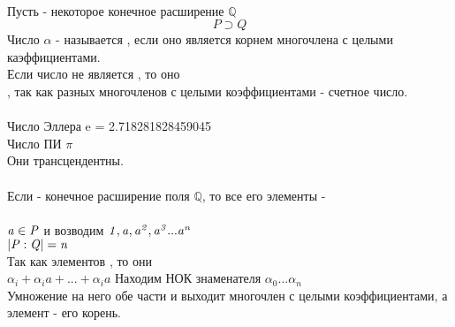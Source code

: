  \\
Пусть  - некоторое конечное расширение $\mathbb Q$\\
\[P \supset Q \]
Число $\alpha$ - называется , если оно является корнем многочлена с целыми каэффициентами. \\
Если число не является , то оно  \\

, так как разных многочленов с целыми коэффициентами - счетное число. \\
 \\
Число Эллера {\bk e} = 2.718281828459045 \\
Число ПИ $\pi $ \\
Они трансцендентны.\\

 \\

Если  - конечное расширение поля $\mathbb {Q}$, то все его элементы -  \\

 \\
$\mathit {a \in P}$ и возводим $\mathit {1, a, a^2, a^3...a^n}$ \\
$\mathit {|P:Q| = n}$ \\
Так как элементов , то они  \\
$\alpha_{i} + \alpha_{i}a + ... + \alpha_{i}a$  %
Находим НОК знаменателя $\alpha_{0} ... \alpha_{n}$ \\
Умножение на него обе части и выходит многочлен с целыми коэффициентами, а элемент  - его корень.
